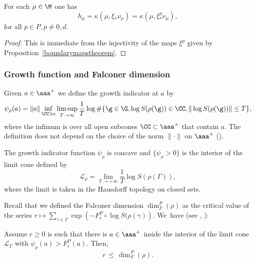 
\begin{theorem}\label{entropytheorem}
For each \(\mu \in \M\) one has
\[
h_\mu = \kappa(\mu,\xi_*\nu_\mu) = \kappa(\mu,\xi^p_*\nu_\mu),
\]
for all \(p \in P, p\not = 0,d\).
\end{theorem}
\begin{proof}
This is immediate from the injectivity of the maps \(\xi^p\) given by Proposition~\ref{boundarymapstheorem}.
\end{proof}

\subsubsection{Growth function and Falconer dimension}

Given \(a \in \aaa^+\) we define the growth indicator at \(a\) by
\begin{equation}\label{growth}
\psi_\rho(a) = \| a\| \inf_{\CC \ni a}
\limsup_{T \to \infty } \frac{1}{T}\log \# \{ \g \in \G, \log S(\rho(\g)) \in \CC, \|\log S(\rho(\g)) \| \leq T\}, \end{equation}
where the infimum is over all open subcones \(\CC \subset \aaa^+\) that contain \(a\). The definition does not depend on the choice of the norm \(\|{\cdot}\| \) on \(\aaa^+\) (\cite{Qui02a}).

\begin{theorem}\label{cone}
The growth indicator function \(\psi_\rho\) is concave and \(\lbrace \psi_\rho > 0\rbrace\) is the interior of the limit cone defined by
\[
\mathcal{L}_\rho = \lim_{T \to +\infty}\frac{1}{T}\log S(\rho(\Gamma)),
\]
where the limit is taken in the Hausdorff topology on closed sets.
\end{theorem}

Recall that we defined the Falconer dimension \(\dim_F^P(\rho)\) as the critical value of the series
\(r \mapsto \sum_{\gamma \in \Gamma}\exp\left(-F^P_r\circ \log S(\rho(\gamma)\right)\). We~have (see \cite[Lem.\,4.2]{sambarino}, \cite[Lem.\,III.1.3]{Qui02a}):

\begin{lemma}\label{falconer2}
Assume \(r\ge 0 \) is such that there is \(a \in \aaa^+ \) inside the interior of the limit cone \(\mathcal{L}_\Gamma \) with \(\psi_\rho (a) > F^P_r (a). \) Then,
\[
 r \, \le \, \dim_F^P (\rho).
\]
\end{lemma}

